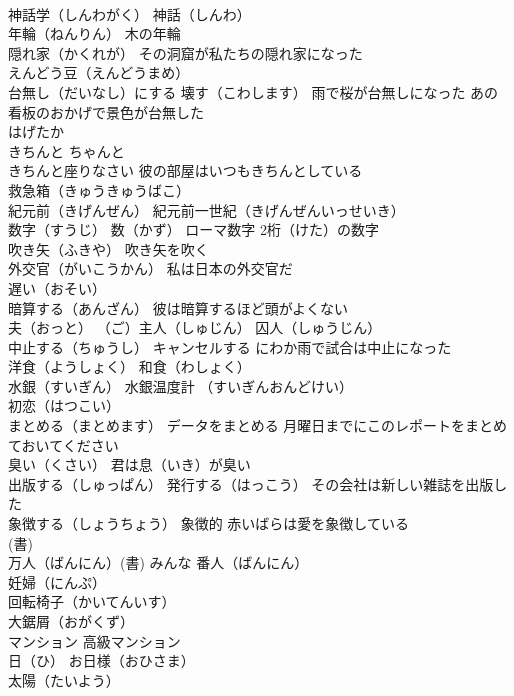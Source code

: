 \documentclass[8pt]{extreport}
\begin{document}
\begin{CJK}{UTF8}{min}
\\	神話学（しんわがく） 神話（しんわ）
\\	年輪（ねんりん） 木の年輪
\\	隠れ家（かくれが） その洞窟が私たちの隠れ家になった
\\	えんどう豆（えんどうまめ）
\\	台無し（だいなし）にする 壊す（こわします） 雨で桜が台無しになった あの看板のおかげで景色が台無した
\\	はげたか
\\	きちんと ちゃんと 
\\	きちんと座りなさい 彼の部屋はいつもきちんとしている
\\	救急箱（きゅうきゅうばこ）
\\	紀元前（きげんぜん） 紀元前一世紀（きげんぜんいっせいき）
\\	数字（すうじ） 数（かず） ローマ数字 2桁（けた）の数字
\\	吹き矢（ふきや） 吹き矢を吹く
\\	外交官（がいこうかん） 私は日本の外交官だ
\\	遅い（おそい）
\\	暗算する（あんざん） 彼は暗算するほど頭がよくない
\\	夫（おっと） （ご）主人（しゅじん） 囚人（しゅうじん）
\\	中止する（ちゅうし） キャンセルする にわか雨で試合は中止になった
\\	洋食（ようしょく） 和食（わしょく）
\\	水銀（すいぎん） 水銀温度計 （すいぎんおんどけい）
\\	初恋（はつこい）
\\	まとめる（まとめます） データをまとめる 月曜日までにこのレポートをまとめておいてください
\\	臭い（くさい） 君は息（いき）が臭い
\\	出版する（しゅっぱん） 発行する（はっこう） その会社は新しい雑誌を出版した
\\	象徴する（しょうちょう） 象徴的 赤いばらは愛を象徴している
\\	(書) 
\\	万人（ばんにん）(書) みんな 番人（ばんにん）
\\	妊婦（にんぷ）
\\	回転椅子（かいてんいす）
\\	大鋸屑（おがくず）
\\	マンション 高級マンション
\\	日（ひ） お日様（おひさま）
\\	太陽（たいよう）

\end{CJK}
\end{document}
